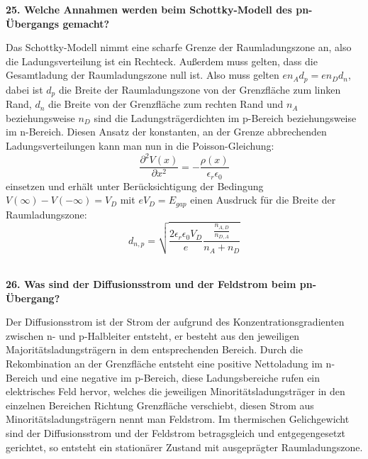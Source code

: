 \noindent\textbf{25. Welche Annahmen werden beim Schottky-Modell des pn-Übergangs gemacht?}\\
\begin{addmargin}[25pt]{0pt}
Das Schottky-Modell nimmt eine scharfe Grenze der Raumladungszone an, also die Ladungsverteilung ist ein Rechteck. Außerdem muss gelten, dass die Gesamtladung der Raumladungszone null ist. Also muss gelten $en_Ad_p = en_Dd_n$, dabei ist $d_p$ die Breite der Raumladungszone von der Grenzfläche zum linken Rand, $d_n$ die Breite von der Grenzfläche zum rechten Rand und $n_A$ beziehungsweise $n_D$ sind die Ladungsträgerdichten im p-Bereich beziehungsweise im n-Bereich. Diesen Ansatz der konstanten, an der Grenze abbrechenden Ladungsverteilungen kann man nun in die Poisson-Gleichung:
\begin{equation}\label{eq:Poissono-Gleichung}
    \frac{\partial^2V(x)}{\partial x^2} = -\frac{\rho(x)}{\epsilon_r\epsilon_0}
\end{equation}
einsetzen und erhält unter Berücksichtigung der Bedingung $V(\infty) - V(-\infty) = V_D$ mit $eV_D = E_{gap}$ einen Ausdruck für die Breite der Raumladungszone:
\begin{equation}\label{eq:Breite_Raumladungszone}
    d_{n,p} = \sqrt{\frac{2\epsilon_r\epsilon_0V_D}{e} \frac{\frac{n_{A,D}}{n_{D,A}}}{n_A + n_D}}
\end{equation}\\
\end{addmargin}

\noindent\textbf{26. Was sind der Diffusionsstrom und der Feldstrom beim pn-Übergang?}\\
\begin{addmargin}[25pt]{0pt}
Der Diffusionsstrom ist der Strom der aufgrund des Konzentrationsgradienten zwischen n- und p-Halbleiter entsteht, er besteht aus den jeweiligen Majoritätsladungsträgern in dem entsprechenden Bereich. Durch die Rekombination an der Grenzfläche entsteht eine positive Nettoladung im n-Bereich und eine negative im p-Bereich, diese Ladungsbereiche rufen ein elektrisches Feld hervor, welches die jeweiligen Minoritätsladungsträger in den einzelnen Bereichen Richtung Grenzfläche verschiebt, diesen Strom aus Minoritätsladungsträgern nennt man Feldstrom. Im thermischen Gelichgewicht sind der Diffusionsstrom und der Feldstrom betragsgleich und entgegengesetzt gerichtet, so entsteht ein stationärer Zustand mit ausgeprägter Raumladungszone.\\
\end{addmargin}

